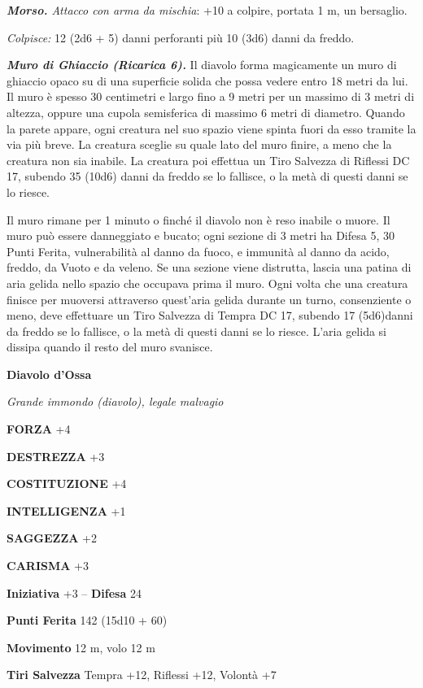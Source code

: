 \begin{multicols}{2}
	\textit{\textbf{Morso.} Attacco con arma da mischia}: +10 a colpire, portata 1 m, un bersaglio.

	\textit{Colpisce:} 12 (2d6 + 5) danni perforanti più 10 (3d6) danni da freddo.

	\textit{\textbf{Muro di Ghiaccio (Ricarica 6).}} Il diavolo forma magicamente un muro di ghiaccio opaco su di una superficie solida che possa vedere entro 18 metri da lui. Il muro è spesso 30 centimetri e largo fino a 9 metri per un massimo di 3 metri di altezza, oppure  una cupola semisferica di massimo 6 metri di diametro. Quando la  parete appare, ogni creatura nel suo spazio viene spinta fuori da esso  tramite la via più breve. La creatura sceglie su quale lato del muro  finire, a meno che la creatura non sia inabile. La creatura poi  effettua un Tiro Salvezza di Riflessi DC 17, subendo 35 (10d6) danni da freddo se lo fallisce, o la metà di questi danni se lo riesce.

	Il muro rimane per 1 minuto o finché il diavolo non è reso inabile o muore. Il muro può essere danneggiato e bucato; ogni sezione di 3 metri ha Difesa 5, 30 Punti Ferita, vulnerabilità al danno da fuoco, e immunità al danno da acido, freddo, da Vuoto e da veleno. Se una sezione viene distrutta, lascia una patina di aria gelida nello spazio che occupava prima il muro. Ogni volta che una creatura finisce per muoversi attraverso quest'aria gelida durante un turno, consenziente o meno, deve effettuare un Tiro Salvezza di Tempra DC 17, subendo 17 (5d6)danni da freddo se lo fallisce, o la metà di questi danni se lo riesce. L'aria gelida si dissipa quando il resto del muro svanisce.


	\medskip{}\textbf{Diavolo d'Ossa}

	\textit{Grande immondo (diavolo), legale malvagio}

	\textbf{FORZA} +4

	\textbf{DESTREZZA} +3

	\textbf{COSTITUZIONE} +4

	\textbf{INTELLIGENZA} +1

	\textbf{SAGGEZZA} +2

	\textbf{CARISMA} +3

	\textbf{Iniziativa} +3 -- \textbf{Difesa} 24

	\textbf{Punti Ferita} 142 (15d10 + 60)

	\textbf{Movimento} 12 m, volo 12 m

	\textbf{Tiri Salvezza} Tempra +12, Riflessi +12, Volontà +7


\end{multicols}
